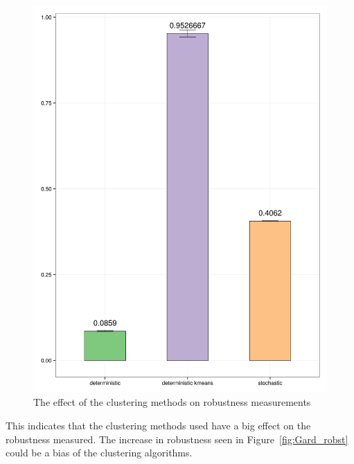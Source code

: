 \begin{figure}[h]
\centering
\includegraphics[scale=0.15]{chapterStabilityFinder/images/Gardner/robustness_comparison_gard_stoch_determ_kmeans.png}
\caption{The effect of the clustering methods on robustness measurements}
\label{fig:Gard_det_stoch_kmeans}
\end{figure}

This indicates that the clustering methods used have a big effect on the robustness measured. The increase in robustness seen in Figure~\ref{fig:Gard_robst} could be a bias of the clustering algorithms.
\clearpage
